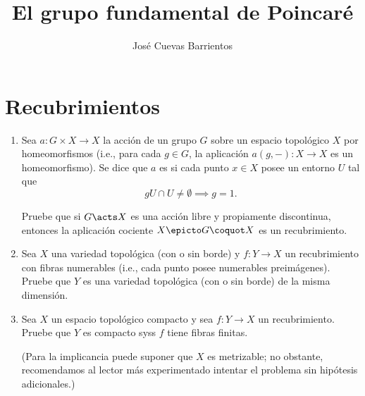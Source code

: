 \documentclass[11pt, reqno]{amsart}
\title{El grupo fundamental de Poincaré}
\date{\DTMdate{2026-10-08}}
\author{José Cuevas Barrientos}
\begin{document}
\maketitle

\section{Recubrimientos}
\begin{enumerate}
	\item\lookright
		Sea $a \colon G\times X \to X$ la acción de un grupo $G$ sobre un espacio topológico $X$ por homeomorfismos
		(i.e., para cada $g \in G$, la aplicación $a(g, -) \colon X \to X$ es un homeomorfismo).
		Se dice que $a$ es  si cada punto $x \in X$ posee un entorno $U$ tal que
		\[
			gU \cap U \ne \emptyset \implies g = 1.
		\]
		\par
		Pruebe que si $G \acts X$ es una acción libre y propiamente discontinua, entonces la aplicación cociente $X \epicto G
		\coquot X$ es un recubrimiento.

	\item Sea $X$ una variedad topológica (con o sin borde) y $f \colon Y \to X$ un recubrimiento con fibras numerables (i.e., cada punto posee numerables preimágenes).
		Pruebe que $Y$ es una variedad topológica (con o sin borde) de la misma dimensión.\footnotemark{}

	\item Sea $X$ un espacio topológico compacto y sea $f\colon Y \to X$ un recubrimiento.
		Pruebe que $Y$ es compacto syss $f$ tiene fibras finitas.

		(Para la implicancia \textquote{$\implies$} puede suponer que $X$ es metrizable; no obstante,
		recomendamos al lector más experimentado intentar el problema sin hipótesis adicionales.)
\end{enumerate}
\end{document}
